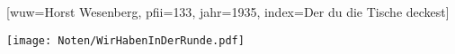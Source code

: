 [wuw={Horst Wesenberg}, pfii={133}, jahr={1935}, index={Der du die Tische deckest}]

\markboth{\songtitle}{\songtitle}

\beginverse
\endverse
\centering\texttt{[image: Noten/WirHabenInDerRunde.pdf]}

\endsong

\beginscripture{}

\endscripture

\begin{intersong}

\end{intersong}